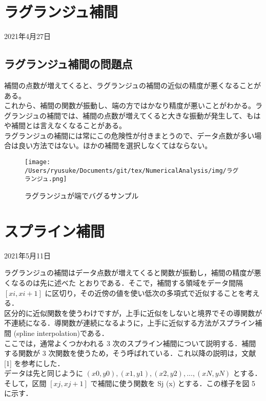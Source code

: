 \documentclass[dvipdfmx,uplatex]{jsarticle}
\begin{document}
\begin{spacing}{1.4}
\section{ラグランジュ補間}
\begin{center}
  2021年4月27日 \\
\end{center}

\subsection{ラグランジュ補間の問題点}
補間の点数が増えてくると、ラグランジュの補間の近似の精度が悪くなることがある。\\これから、補間の関数が振動し、端の方ではかなり精度が悪いことがわかる。ラグランジュの補間では、補間の点数が増えてくると大きな振動が発生して、もはや補間とは言えなくなることがある。\\
ラグランジュの補間には常にこの危険性が付きまとうので、データ点数が多い場合は良い方法ではない。ほかの補間を選択しなくてはならない。

\begin{figure}[htbp]
\begin{center}
\texttt{[image: /Users/ryusuke/Documents/git/tex/NumericalAnalysis/img/ラグランジュ.png]}
\caption{ラグランジュが端でバグるサンプル}
\end{center}
\end{figure}

\newpage

\section{スプライン補間}
\begin{center}
  2021年5月11日 \\
\end{center}
ラグランジュの補間はデータ点数が増えてくると関数が振動し，補間の精度が悪くなるのは先に述べた
とおりである．そこで，補間する領域をデータ間隔 $[xi, xi+1]$ に区切り，その近傍の値を使い低次の多項式で近似することを考える．\\
区分的に近似関数を使うわけですが，上手に近似をしないと境界でその導関数が不連続になる．導関数が連続になるように，上手に近似する方法がスプライン補間 (spline interpolation)である．\\
ここでは，通常よくつかわれる 3 次のスプライン補間について説明する．補間する関数が 3 次関数を使うため，そう呼ばれている．これ以降の説明は，文献 [1] を参考にした．\\
データは先と同じように $(x0, y0),(x1, y1), (x2, y2), ... , (xN , yN )$ とする．そして，区間 $[xj , xj+1]$ で補間に使う関数を Sj (x) とする．この様子を図 5 に示す．


\end{spacing}
\end{document}
